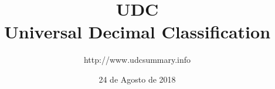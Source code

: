 \documentclass[12pt]{article}
\begin{document}
\title{ UDC\\ Universal Decimal Classification}%
\author{http://www.udcsummary.info}%

\date{24 de Agosto de 2018}%
\maketitle

\end{document}
